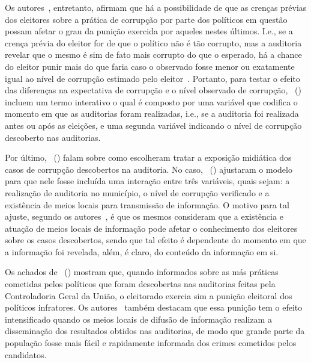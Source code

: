 \documentclass[
	12pt,				%
	openright,			%
	twoside,			%
	a4paper,			%
	openany,
	english,			%
	brazil				%
	]{abntex2}
\begin{document}

Os autores~\cite{ferraz2008exposing}, entretanto, afirmam que há a possibilidade de que as crenças prévias dos eleitores sobre a prática de corrupção por parte dos políticos em questão possam afetar o grau da punição exercida por aqueles nestes últimos. I.e., se a crença prévia do eleitor for de que o político não é tão corrupto, mas a auditoria revelar que o mesmo é sim de fato mais corrupto do que o esperado, há a chance do eleitor punir mais do que faria caso o observado fosse menor ou exatamente igual ao nível de corrupção estimado pelo eleitor~\cite{ferraz2008exposing}. Portanto, para testar o efeito das diferenças na expectativa de corrupção e o nível observado de corrupção, ~(\citeyear{ferraz2008exposing}) incluem um termo interativo o qual é composto por uma variável que codifica o momento em que as auditorias foram realizadas, i.e., se a auditoria foi realizada antes ou após as eleições, e uma segunda variável indicando o nível de corrupção descoberto nas auditorias.


Por último, ~(\citeyear{ferraz2008exposing}) falam sobre como escolheram tratar a exposição midiática dos casos de corrupção descobertos na auditoria. No caso, ~(\citeyear{ferraz2008exposing}) ajustaram o modelo para que nele fosse incluída uma interação entre três variáveis, quais sejam: a realização de auditoria no município, o nível de corrupção verificado e a existência de meios locais para transmissão de informação. O motivo para tal ajuste, segundo os autores~\cite{ferraz2008exposing}, é que os mesmos consideram que a existência e atuação de meios locais de informação pode afetar o conhecimento dos eleitores sobre os casos descobertos, sendo que tal efeito é dependente do momento em que a informação foi revelada, além, é claro, do conteúdo da informação em si.

Os achados de ~(\citeyear{ferraz2008exposing}) mostram que, quando informados sobre as más práticas cometidas pelos políticos que foram descobertas nas auditorias feitas pela Controladoria Geral da União, o eleitorado exercia sim a punição eleitoral dos políticos infratores. Os autores~\cite{ferraz2008exposing} também destacam que essa punição tem o efeito intensificado quando os meios locais de difusão de informação realizam a disseminação dos resultados obtidos nas auditorias, de modo que grande parte da população fosse mais fácil e rapidamente informada dos crimes cometidos pelos candidatos.
\end{document}
